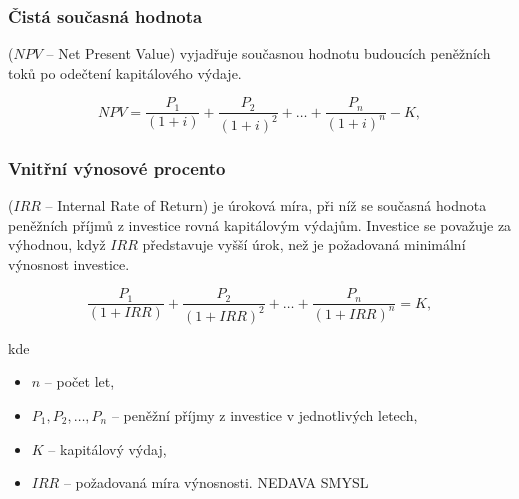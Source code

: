 \subsubsection*{Čistá současná hodnota}
($NPV$ -- Net Present Value)
vyjadřuje současnou hodnotu budoucích peněžních toků po odečtení kapitálového výdaje.

\begin{equation}    
NPV = \frac{P_1}{(1+i)} + \frac{P_2}{(1+i)^2} + \ldots + \frac{P_n}{(1+i)^n} - K,
\end{equation}

\subsubsection*{Vnitřní výnosové procento}
($IRR$ -- Internal Rate of Return)
je úroková míra, při níž se současná hodnota peněžních příjmů z investice rovná kapitálovým výdajům. Investice se považuje za výhodnou, když $IRR$ představuje vyšší úrok, než je požadovaná minimální výnosnost investice.

\begin{equation}
    \frac{P_1}{(1+IRR)} + \frac{P_2}{(1+IRR)^2} + \ldots + \frac{P_n}{(1+IRR)^n} = K,
\end{equation}

kde
\begin{itemize}[label={}]
    \item $n$ -- počet let,
    \item $P_1, P_2, \ldots, P_n$ -- peněžní příjmy z investice v jednotlivých letech,
    \item $K$ -- kapitálový výdaj,
    \color{red}
    \item $IRR$ -- požadovaná míra výnosnosti. NEDAVA SMYSL
\end{itemize}
